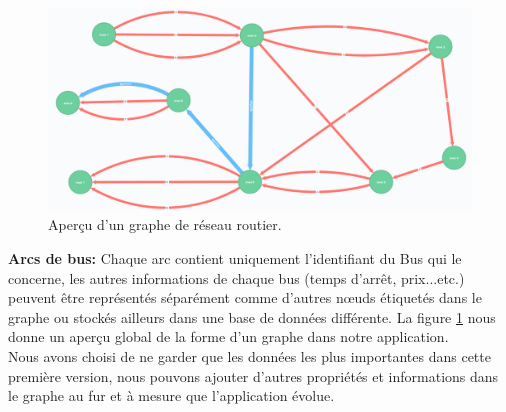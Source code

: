 \begin{figure}[h!]
	\center
	\includegraphics[width=1.1\textwidth]{img/GrapheNeo4j.png}
	\caption{Aperçu d'un graphe de réseau routier.}
	\label{fig:transportGraph}
\end{figure}

\textbf{Arcs de bus: } Chaque arc contient uniquement l'identifiant du Bus qui le concerne, les autres informations de chaque bus (temps d'arrêt, prix...etc.) peuvent être représentés séparément comme d'autres nœuds étiquetés dans le graphe ou stockés ailleurs dans une base de données différente. \newline
La figure \ref{fig:transportGraph} nous donne un aperçu global de la forme d'un graphe dans notre application.\\
Nous avons choisi de ne garder que les données les plus importantes dans cette première version, nous pouvons ajouter d'autres propriétés et informations dans le graphe au fur et à mesure que l'application évolue.

%

